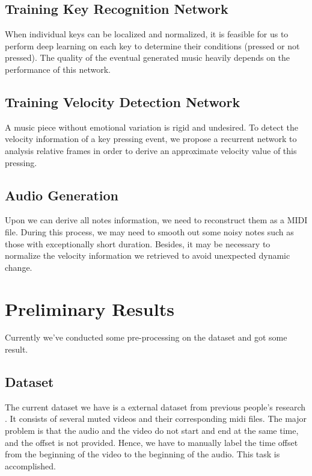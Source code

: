 \documentclass[10pt,twocolumn,letterpaper]{article}
\begin{document}
\subsection{Training Key Recognition Network}

When individual keys can be localized and normalized, it is feasible for us to perform deep learning on each key to determine their conditions (pressed or not pressed). The quality of the eventual generated music heavily depends on the performance of this network.

\subsection{Training Velocity Detection Network}

A music piece without emotional variation is rigid and undesired. To detect the velocity information of a key pressing event, we propose a recurrent network to analysis relative frames in order to derive an approximate velocity value of this pressing.

\subsection{Audio Generation}

Upon we can derive all notes information, we need to reconstruct them as a MIDI file. During this process, we may need to smooth out some noisy notes such as those with exceptionally short duration. Besides, it may be necessary to normalize the velocity information we retrieved to avoid unexpected dynamic change.

\section{Preliminary Results}
Currently we've conducted some pre-processing on the dataset and got some result.

\subsection{Dataset}
The current dataset we have is a external dataset from previous people’s research \cite{Akbari}.
It consists of several muted videos and their corresponding midi files.
The major problem is that the audio and the video do not start and end at the same time, and the offset is not provided.
Hence, we have to manually label the time offset from the beginning of the video to the beginning of the audio.
This task is accomplished.
\end{document}
